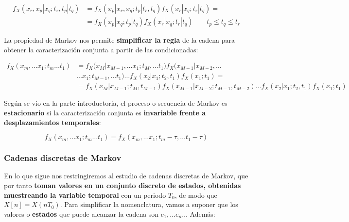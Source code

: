 \documentclass[11pt]{article}
\begin{document}
\begin{align*}
f_X(x_r , x_p| x_q; t_r , t_p | t_q) &= f_X(x_p | x_r , x_q ; t_p | t_r , t_q) f_X(x_r | x_q ; t_r | t_q) = \\
&= f_X(x_p | x_q ; t_p | t_q) f_X(x_r | x_q ; t_r | t_q) \qquad t_p \leq t_q \leq t_r
\end{align*}

La propiedad de Markov nos permite \textbf{simplificar la regla} de la
cadena para obtener la caracterización conjunta a partir de las
condicionadas:

\begin{align*}
f_X(x_m, \ldots x_1; t_m \ldots t_1) &= f_X(x_M | x_{M-1} ,\ldots x_1 ; t_M ,\ldots t_1) f_X(x_{M-1} | x_{M-2} ,\ldots \\
 &  \ldots x_1 ; t_{M-1} ,\ldots t_1) \ldots f_X(x_2 | x_1 ; t_2 , t_1) f_X(x_1 ; t_1) =\\
&= f_X(x_M | x_{M-1} ; t_M , t_{M-1}) f_X(x_{M-1} | x_{M-2} ; t_{M-1},t_{M-2}) \ldots f_X(x_2 | x_1 ; t_2 , t_1) f_X(x_1 ; t_1) 
\end{align*}

Según se vio en la parte introductoria, el proceso o secuencia de Markov
es \textbf{estacionario} si la caracterización conjunta es
\textbf{invariable frente a desplazamientos temporales}:

\[
f_X(x_m, \ldots x_1; t_m \ldots t_1) = f_X(x_m, \ldots x_1; t_m -\tau ,\ldots t_1 - \tau)
\]

    \hypertarget{cadenas-discretas-de-markov}{%
\subsubsection{Cadenas discretas de
Markov}\label{cadenas-discretas-de-markov}}

En lo que sigue nos restringiremos al estudio de cadenas discretas de
Markov, que por tanto \textbf{toman valores en un conjunto discreto de
estados, obtenidas muestreando la variable temporal} con un periodo
\(T_0\), de modo que \(X[n] = X(nT_0)\). Para simplificar la
nomenclatura, vamos a suponer que los valores o \textbf{estados} que
puede alcanzar la cadena son \(e_1, \ldots e_n \ldots\) Además:
\end{document}
